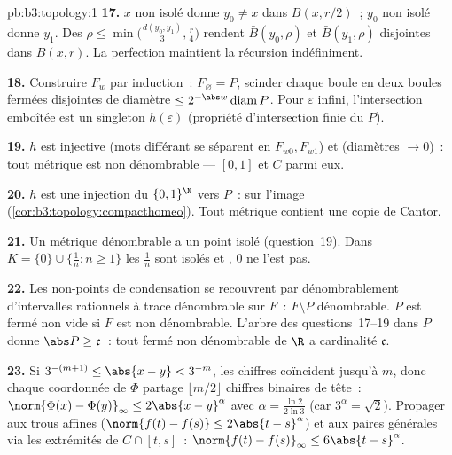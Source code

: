 \begin{solution}{pb:b3:topology:1}
\textbf{17.} $x$ non isolé donne $y_0 \neq x$ dans $B(x,
r/2)$~; $y_0$ non isolé donne $y_1$. Des $\rho \leq
\min\bigl(\frac{d(y_0,y_1)}3, \frac r4\bigr)$ rendent
$\bar B(y_0, \rho)$ et $\bar B(y_1, \rho)$ disjointes dans
$B(x, r)$. La perfection maintient la récursion indéfiniment.

\textbf{18.} Construire $F_w$ par induction~: $F_\varnothing
= P$, scinder chaque boule en deux boules fermées disjointes
de diamètre $\leq 2^{-\abs w}\operatorname{diam}P$. Pour
$\varepsilon$ infini, l'intersection emboîtée est un
singleton $h(\varepsilon)$ (propriété d'intersection finie
du  $P$).

\textbf{19.} $h$ est injective (mots différant se séparent en
$F_{w0}, F_{w1}$) et  (diamètres $\to 0$)~: tout
 métrique  est non dénombrable --- $[0,1]$ et
$C$ parmi eux.

\textbf{20.} $h$ est une injection  du 
$\{0,1\}^\N$ vers $P$~:  sur l'image
(\cref{cor:b3:topology:compacthomeo}). Tout  métrique
 contient une copie de Cantor.

\textbf{21.} Un  métrique dénombrable a un point
isolé (question~19). Dans $K = \{0\}\cup\{\frac1n : n
\geq 1\}$ les $\frac1n$ sont isolés et , $0$ ne l'est
pas.

\textbf{22.} Les non-points de condensation se recouvrent par
dénombrablement d'intervalles rationnels à trace dénombrable
sur $F$~: $F \setminus P$ dénombrable. $P$ est  fermé
non vide si $F$ est non dénombrable. L'arbre des
questions~17--19 dans $P$ donne $\abs P \geq \mathfrak c$~:
tout fermé non dénombrable de $\R$ a cardinalité $\mathfrak
c$.

\textbf{23.} Si $3^{-(m+1)} \leq \abs{x-y} < 3^{-m}$, les
chiffres coïncident jusqu'à $m$, donc chaque coordonnée de
$\Phi$ partage $\lfloor m/2\rfloor$ chiffres binaires de
tête~: $\norm{\Phi(x)-\Phi(y)}_\infty \leq
2\abs{x-y}^\alpha$ avec $\alpha = \frac{\ln2}{2\ln3}$
(car $3^\alpha = \sqrt2$). Propager aux trous affines
($\norm{f(t)-f(s)} \leq 2\abs{t-s}^\alpha$) et aux paires
générales via les extrémités de $C \cap [t,s]$~:
$\norm{f(t)-f(s)}_\infty \leq 6\abs{t-s}^\alpha$.


\end{solution}
